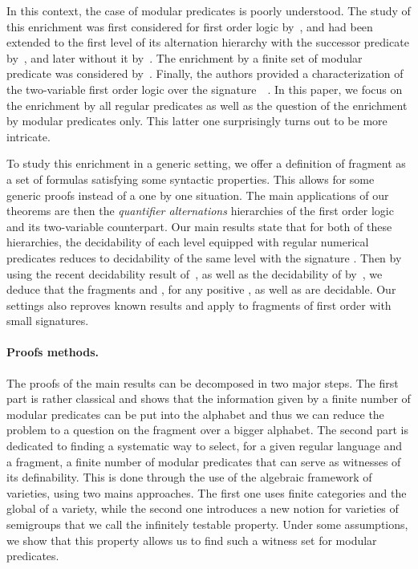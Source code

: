 \documentclass[submission,hidelink]{dmtcs-episciences}
\begin{document}
	In this context, the case of modular predicates is poorly understood.
	The study of this enrichment
	was first considered for first order logic by~\cite{Bar92}, and had been extended to the first
	level of its alternation hierarchy with the successor predicate by~\cite{Pel92},
	and later without it by~\cite{CPS06b}.
		The enrichment by a finite set of modular predicate was considered by~\cite{EI03}.
	Finally, the authors
	provided a characterization of the two-variable first order logic over the signature~~\citep{DP13}.
In this paper, we focus on the enrichment by all regular predicates as well as the question of the enrichment
	by modular predicates only. This latter one surprisingly turns out to be more intricate.

	To study this enrichment in a generic setting, we offer a definition of fragment as a set of formulas satisfying some syntactic properties.
	This allows for some generic proofs instead of a one by one situation.
	The main applications of our theorems are then the \emph{quantifier alternations} hierarchies of the first order logic
	and its two-variable counterpart.
	Our main results state that for both of these hierarchies, the decidability of each level
	equipped with regular numerical predicates reduces to decidability of the same level with the signature .
	Then by using
	the recent decidability result of~\cite{KL13}, as well as the decidability of 
	by~\cite{PZ14}, we deduce that the fragments  and , for any positive , as well as  are decidable.
	Our settings also reproves known results and apply to fragments of first order with small signatures.


	\paragraph{Proofs methods.}
	The proofs of the main results can be decomposed in two major steps.
	 The first part is rather classical and shows that the information given by a finite number of modular predicates can be put into the alphabet and thus we can reduce the problem to a question on the fragment over a bigger alphabet.
	The second part is dedicated to finding a systematic way to select,
	for a given regular language and a fragment, a finite number of
	modular predicates that can serve as witnesses of its definability.
This is done through the use of the algebraic
	framework of varieties, using two mains approaches.
	The first one uses finite categories and the global of a variety, while the second one
	introduces a new  notion for
	varieties of semigroups that we call the infinitely testable property.
	Under some assumptions, we show that this property
	allows us to find such a witness set for modular predicates.
\end{document}

